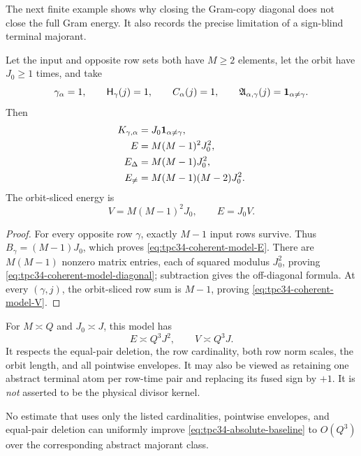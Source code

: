 The next finite example shows why closing the Gram-copy diagonal does not
close the full Gram energy.  It also records the precise limitation of a
sign-blind terminal majorant.

\begin{proposition}
\label{prop:tpc34-coherent-majorant}
Let the input and opposite row sets both have \(M\ge2\) elements, let the
orbit have \(J_0\ge1\) times, and take
\begin{equation}
 \gamma_\alpha=1,\qquad
 \mathsf H_\gamma(j)=1,\qquad
 C_\alpha(j)=1,\qquad
 \mathfrak A_{\alpha,\gamma}(j)=\mathbf 1_{\alpha\ne\gamma}.
 \label{eq:tpc34-coherent-model-data}
\end{equation}
Then
\begin{align}
 K_{\gamma,\alpha}
 &=J_0\mathbf 1_{\alpha\ne\gamma},
 \label{eq:tpc34-coherent-model-K}\\
 E
 &=M(M-1)^2J_0^2,
 \label{eq:tpc34-coherent-model-E}\\
 E_\Delta
 &=M(M-1)J_0^2,
 \label{eq:tpc34-coherent-model-diagonal}\\
 E_{\ne}
 &=M(M-1)(M-2)J_0^2.
 \label{eq:tpc34-coherent-model-offdiagonal}
\end{align}
The orbit-sliced energy is
\begin{equation}
 V=M(M-1)^2J_0,
 \qquad E=J_0V.
 \label{eq:tpc34-coherent-model-V}
\end{equation}
\end{proposition}

\begin{proof}
For every opposite row \(\gamma\), exactly \(M-1\) input rows survive.
Thus \(B_\gamma=(M-1)J_0\), which proves
\eqref{eq:tpc34-coherent-model-E}.  There are \(M(M-1)\) nonzero matrix
entries, each of squared modulus \(J_0^2\), proving
\eqref{eq:tpc34-coherent-model-diagonal}; subtraction gives the
off-diagonal formula.  At every \((\gamma,j)\), the orbit-sliced row sum
is \(M-1\), proving \eqref{eq:tpc34-coherent-model-V}.
\end{proof}

For \(M\asymp Q\) and \(J_0\asymp J\), this model has
\[
 E\asymp Q^3J^2,\qquad V\asymp Q^3J.
\]
It respects the equal-pair deletion, the row cardinality, both row norm
scales, the orbit length, and all pointwise envelopes.  It may also be
viewed as retaining one abstract terminal atom per row-time pair and
replacing its fused sign by \(+1\).  It is \emph{not} asserted to be the
physical divisor kernel.

\begin{corollary}
\label{cor:tpc34-sign-blind-boundary}
No estimate that uses only the listed cardinalities, pointwise envelopes,
and equal-pair deletion can uniformly improve
\eqref{eq:tpc34-absolute-baseline} to \(O(Q^3)\) over the corresponding
abstract majorant class.
\end{corollary}

